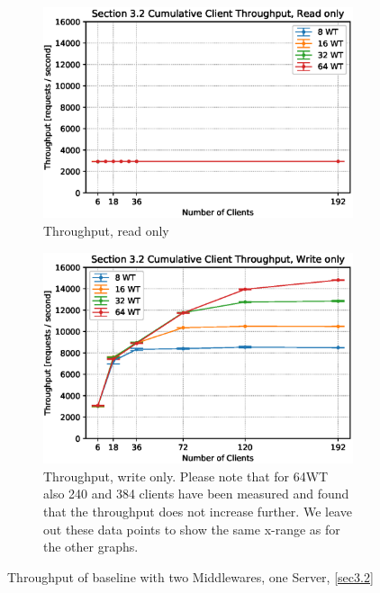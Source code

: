 \documentclass[11pt,a4paper]{article}
\begin{document}
\begin{figure}
    \begin{subfigure}{.5\textwidth}
        \includegraphics[width=1\linewidth]{plots/3_2a_throughputMiddleware.eps}
        \caption{Throughput, read only}
    \end{subfigure}
    \begin{subfigure}{.5\textwidth}
        \includegraphics[width=1\linewidth]{plots/3_2b_throughputMiddleware.eps}
        \caption{Throughput, write only. Please note that for 64WT also 240 and 384 clients have been measured and found that the throughput does not increase further. We leave out these data points to show the same x-range as for the other graphs.}
    \end{subfigure}

    \caption{Throughput of baseline with two Middlewares, one Server, \autoref{sec3.2}}
    \label{fig:3-2-throughput}
\end{figure}
\end{document}
